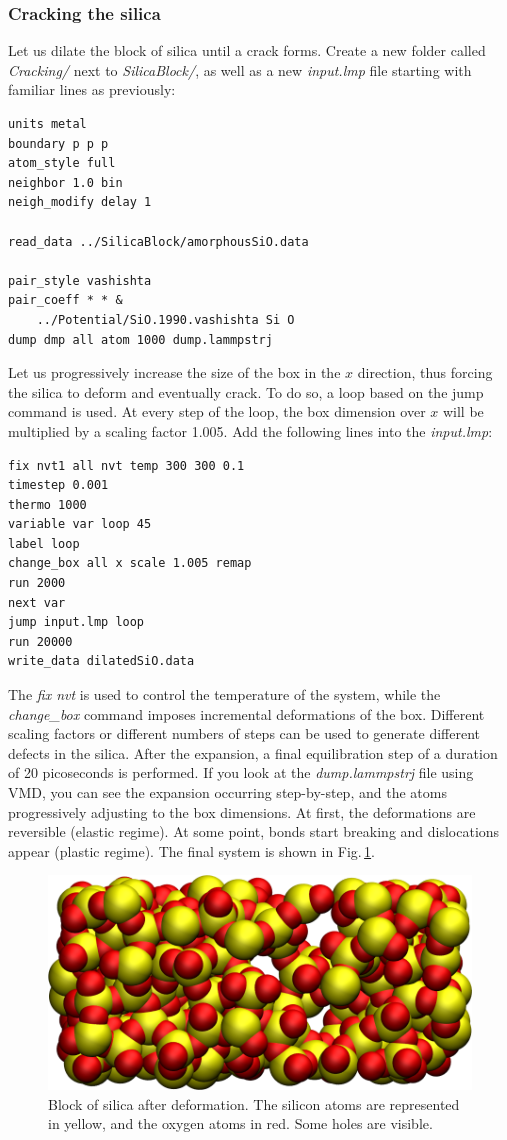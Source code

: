 \documentclass[9pt,tutorial]{livecoms}
\begin{document}
\subsubsection{Cracking the silica}
Let us dilate the block of silica until a crack forms. Create a new folder
called \textit{Cracking/} next to \textit{SilicaBlock/}, as well as a new
\textit{input.lmp} file starting with familiar lines as previously:
\begin{lstlisting}
units metal
boundary p p p
atom_style full
neighbor 1.0 bin
neigh_modify delay 1

read_data ../SilicaBlock/amorphousSiO.data

pair_style vashishta
pair_coeff * * &
    ../Potential/SiO.1990.vashishta Si O
dump dmp all atom 1000 dump.lammpstrj
\end{lstlisting}
Let us progressively increase the size of the box in the $x$ direction, thus forcing
the silica to deform and eventually crack. To do so, a loop based on the jump command
is used. At every step of the loop, the box dimension over $x$ will be multiplied
by a scaling factor 1.005. Add the following lines into the \textit{input.lmp}:
\begin{lstlisting}
fix nvt1 all nvt temp 300 300 0.1
timestep 0.001
thermo 1000
variable var loop 45
label loop
change_box all x scale 1.005 remap
run 2000
next var
jump input.lmp loop
run 20000
write_data dilatedSiO.data
\end{lstlisting}
The \textit{fix nvt} is used to control the temperature of the system, while the
\textit{change\_box} command imposes incremental deformations of the box. Different
scaling factors or different numbers of steps can be used to generate different
defects in the silica. After the expansion, a final equilibration step of a duration
of 20 picoseconds is performed. If you look at the \textit{dump.lammpstrj} file
using VMD, you can see the expansion occurring step-by-step, and the atoms
progressively adjusting to the box dimensions. At first, the deformations are
reversible (elastic regime). At some point, bonds start breaking and dislocations
appear (plastic regime). The final system is shown in Fig.\,\ref{fig:GCMC-cracked}.

\begin{figure}
\centering
\includegraphics[width=\linewidth]{GCMC-cracked}
\caption{Block of silica after deformation. The silicon atoms are represented in
yellow, and the oxygen atoms in red. Some holes are visible.}
\label{fig:GCMC-cracked}
\end{figure}
\end{document}
